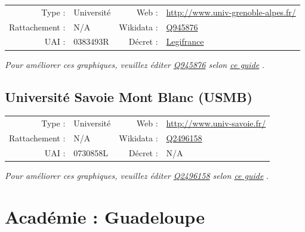 \documentclass[12pt,french,landscape]{article}
\begin{document}
\begin{tabular*}{0.45\textwidth}{rp{2cm}rl}  
\hline  
Type : & Université & Web : &\href{http://www.univ-grenoble-alpes.fr/}{http://www.univ-grenoble-alpes.fr/} \\  
Rattachement : & N/A & Wikidata : & \href{https://www.wikidata.org/entity/Q945876}{Q945876} \\  
UAI : & 0383493R & Décret : & \href{http://legifrance.gouv.fr/affichTexte.do?cidTexte=JORFTEXT000031147890&dateTexte=&categorieLien=id}{Legifrance} \\  
\hline  
\end{tabular*}

\textit{\scriptsize Pour améliorer ces graphiques, veuillez éditer \href{https://www.wikidata.org/entity/Q945876}{Q945876}  selon \href{https://github.com/cpesr/wikidataESR/blob/master/Rmd/wikidataESR.md}{ce guide}}
.


\newpage

\hypertarget{universituxe9-savoie-mont-blanc-usmb}{%
\subsection{Université Savoie Mont Blanc
(USMB)}\label{universituxe9-savoie-mont-blanc-usmb}}

\begin{tabular*}{0.45\textwidth}{rp{2cm}rl}  
\hline  
Type : & Université & Web : &\href{http://www.univ-savoie.fr/}{http://www.univ-savoie.fr/} \\  
Rattachement : & N/A & Wikidata : & \href{https://www.wikidata.org/entity/Q2496158}{Q2496158} \\  
UAI : & 0730858L & Décret : & N/A \\  
\hline  
\end{tabular*}

\textit{\scriptsize Pour améliorer ces graphiques, veuillez éditer \href{https://www.wikidata.org/entity/Q2496158}{Q2496158}  selon \href{https://github.com/cpesr/wikidataESR/blob/master/Rmd/wikidataESR.md}{ce guide}}
.


\newpage

\hypertarget{acaduxe9mie-guadeloupe}{%
\section{Académie : Guadeloupe}\label{acaduxe9mie-guadeloupe}}
\end{document}
